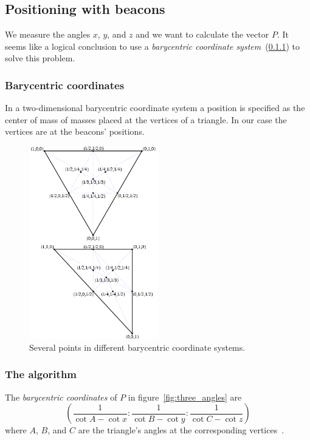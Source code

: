 \documentclass[a4paper, 12pt]{paper}
\begin{document}
\subsection{Positioning with beacons}

We measure the angles $x$, $y$, and $z$ and we want to calculate the vector $P$.
It seems like a logical conclusion to use a
\emph{barycentric coordinate system}~(\ref{ss2:bary}) to solve this problem.


\subsubsection{Barycentric coordinates}
\label{ss2:bary}

In a two-dimensional barycentric coordinate system a position is specified as
the center of mass of masses placed at the vertices of a triangle. In our case
the vertices are at the beacons' positions.

\begin{figure}[H]
    \centering
    \includegraphics[width=0.5\textwidth]{bary}
    \caption{Several points in different barycentric coordinate systems.}
\label{fig:bary}
\end{figure}

\subsubsection{The algorithm}
\label{ss2:algorithm}

The \emph{barycentric coordinates} of $P$ in figure~\ref{fig:three_angles} are
\begin{equation}
    \left(\frac{1}{\cot{A} - \cot{x}} :
          \frac{1}{\cot{B} - \cot{y}} :
          \frac{1}{\cot{C} - \cot{z}} \right)
    \label{eq:p}
\end{equation}
where $A$, $B$, and $C$ are the triangle's angles at the corresponding
vertices~\cite{bary_coordinates_formula}.
\end{document}
